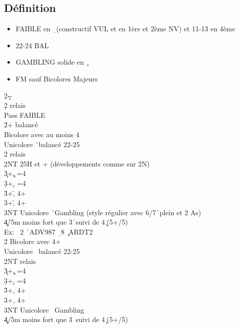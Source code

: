 \documentclass[a4paper]{article}
\begin{document}
\subsection{Définition}

\begin{itemize}
\item FAIBLE en \d\ (constructif VUL et en 1ère et 2ème NV) et 11-13 en 4ème

\item 22-24 BAL

\item GAMBLING solide en \c\ 

\item FM sauf Bicolores Majeurs

\end{itemize}

\begin{bidtable}
2\c--\+\\
2\d \> relais\+\\
Pass \> FAIBLE \d \\
2\h {}+ balancé\\
\>Bicolore avec au moins 4\h \\
\>Unicolore \h\ balancé 22-25\+\\
2\s \> relais\+\\
2NT \> 25H et + (développements comme sur 2N)\\
3\c {}+\c , =4\h \\
3\d {}+\d , =4\h \\
3\h {}+\h , 4+\c \\
3\s {}+\h , 4+\d \\
3NT \> Unicolore \h\ Gambling (style régulier avec 6/7\h\ plein et 2 As)\\
4\c\d {}\h /5m moins fort que 3\h\ suivi de 4\c\ (5+/5)\\
\>Ex: \s\ 2 \h\ ADV987 \d\ 8 \c\ ARDT2\-\-\\
2\s \> Bicolore avec 4+\s \\
\>Unicolore \s\ balancé 22-25\+\\
2NT \> relais\+\\
3\c {}+\c , =4\s \\
3\d {}+\d , =4\s \\
3\h {}+\s , 4+\c \\
3\s {}+\s , 4+\d \\
3NT \> Unicolore \s\ Gambling\\
4\c\d {}\s /5m moins fort que 3\s\ suivi de 4\c\ (5+/5)\-\-\\

\end{bidtable}
\end{document}
